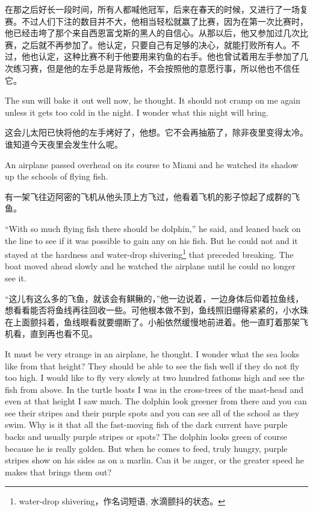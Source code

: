 \begin{paracol}{2}
\switchcolumn

在那之后好长一段时间，所有人都喊他冠军，后来在春天的时候，又进行了一场复赛。不过人们下注的数目并不大，他相当轻松就赢了比赛，因为在第一次比赛时，他已经击垮了那个来自西恩富戈斯的黑人的自信心。从那以后，他又参加过几次比赛，之后就不再参加了。他认定，只要自己有足够的决心，就能打败所有人。不过，他也认定，这种比赛不利于他要用来钓鱼的右手。他也曾试着用左手参加了几次练习赛，但是他的左手总是背叛他，不会按照他的意愿行事，所以他也不信任它。

\switchcolumn*

The sun will \gls{bake} it out well now, he thought. It
should not cramp on me again unless it gets too cold in the night. I wonder
what this night will bring.

\switchcolumn

这会儿太阳已快将他的左手烤好了，他想。它不会再抽筋了，除非夜里变得太冷。谁知道今天夜里会发生什么呢。

\switchcolumn*

An airplane passed overhead on its course to Miami and he watched its shadow
 up the schools of flying fish.

\switchcolumn

有一架飞往迈阿密的飞机从他头顶上方飞过，他看着飞机的影子惊起了成群的飞鱼。

\switchcolumn*

``With so much flying fish there should be dolphin,'' he said, and leaned
back on the line to see if it was possible to gain any on his fish. But he
could not and it stayed at the \gls{hardness} and water-drop
shivering\footnote{water-drop shivering，作名词短语, 水滴颤抖的状态。} that
\gls{preceded} breaking. The boat moved ahead slowly and he watched the
airplane until he could no longer see it.

\switchcolumn

“这儿有这么多的飞鱼，就该会有鲯鳅的，”他一边说着，一边身体后仰着拉鱼线，想看看能否将鱼线再往回收一些。可他根本做不到，鱼线照旧绷得紧紧的，小水珠在上面颤抖着，鱼线眼看就要绷断了。小船依然缓慢地前进着。他一直盯着那架飞机看，直到再也看不见。

\switchcolumn*

It must be very strange in an airplane, he thought. I wonder what the sea
looks like from that height? They should be able to see the fish well if
they do not fly too high. I would like to fly very slowly at two hundred
fathoms high and see the fish from above. In the turtle boats I was in the
cross-trees of the mast-head and even at that height I saw much. The dolphin
look greener from there and you can see their stripes and their purple \glspl{spot}
and you can see all of the school as they swim. Why is it that all the
fast-moving fish of the dark current have purple backs and usually purple
stripes or spots? The dolphin looks green of course because he is really
golden. But when he comes to feed, truly hungry, purple stripes show on his
sides as on a marlin. Can it be \gls{anger}, or the greater speed he makes
that brings them out?


\end{paracol}
